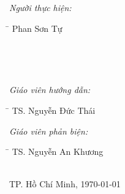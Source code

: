 \begin{titlepage}
\begin{minipage}[t]{0.5\textwidth}
\begin{flushleft} \large
\emph{Người thực hiện:}
\begin{tabbing}
\hspace{4cm}\= \kill
Phan Sơn Tự
\end{tabbing}
\end{flushleft}
\end{minipage}
~
\begin{minipage}{0.2\textwidth}
\end{minipage}
~
\begin{minipage}[t]{0.4\textwidth}
\begin{flushleft} \large
\emph{Giáo viên hướng dẫn:}\\
\begin{tabbing}
\hspace{4cm}\= \kill
TS. Nguyễn Đức Thái
\end{tabbing}
\emph{Giáo viên phản biện:}\\
\begin{tabbing}
\hspace{4cm}\= \kill
TS. Nguyễn An Khương
\end{tabbing}
\end{flushleft}
\end{minipage}\\[1.75cm]



{\large TP. Hồ Chí Minh, \MakeLowercase{\today}}\\[2cm] %


 

\vfill %

\end{titlepage}
